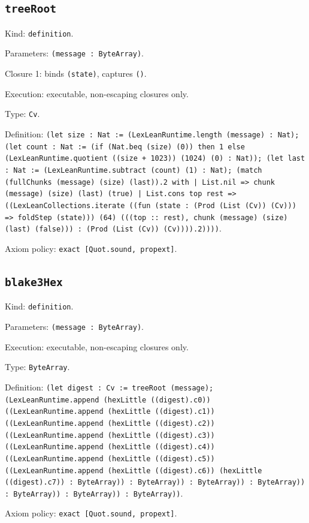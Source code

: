 \documentclass[11pt]{article}
\begin{document}
\subsection*{\texttt{treeRoot}}
\noindent Kind: \texttt{definition}.\par
\noindent Parameters: \texttt{(message : ByteArray)}.\par
\noindent Closure 1: binds \texttt{(state)}, captures \texttt{()}.\par
\noindent Execution: executable, non-escaping closures only.\par
\noindent Type: \texttt{Cv}.\par
\noindent Definition: \texttt{(let size : Nat := (LexLeanRuntime.length (message) : Nat); (let count : Nat := (if (Nat.beq (size) (0)) then 1 else (LexLeanRuntime.quotient ((size + 1023)) (1024) (0) : Nat)); (let last : Nat := (LexLeanRuntime.subtract (count) (1) : Nat); (match (fullChunks (message) (size) (last)).2 with | List.nil => chunk (message) (size) (last) (true) | List.cons top rest => ((LexLeanCollections.iterate ((fun (state : (Prod (List (Cv)) (Cv))) => foldStep (state))) (64) (((top :: rest), chunk (message) (size) (last) (false))) : (Prod (List (Cv)) (Cv)))).2))))}.\par
\noindent Axiom policy: \texttt{exact [Quot.sound, propext]}.\par
\subsection*{\texttt{blake3Hex}}
\noindent Kind: \texttt{definition}.\par
\noindent Parameters: \texttt{(message : ByteArray)}.\par
\noindent Execution: executable, non-escaping closures only.\par
\noindent Type: \texttt{ByteArray}.\par
\noindent Definition: \texttt{(let digest : Cv := treeRoot (message); (LexLeanRuntime.append (hexLittle ((digest).c0)) ((LexLeanRuntime.append (hexLittle ((digest).c1)) ((LexLeanRuntime.append (hexLittle ((digest).c2)) ((LexLeanRuntime.append (hexLittle ((digest).c3)) ((LexLeanRuntime.append (hexLittle ((digest).c4)) ((LexLeanRuntime.append (hexLittle ((digest).c5)) ((LexLeanRuntime.append (hexLittle ((digest).c6)) (hexLittle ((digest).c7)) : ByteArray)) : ByteArray)) : ByteArray)) : ByteArray)) : ByteArray)) : ByteArray)) : ByteArray))}.\par
\noindent Axiom policy: \texttt{exact [Quot.sound, propext]}.\par
\end{document}
